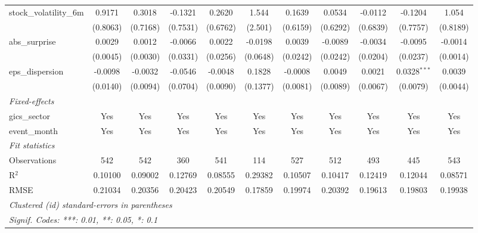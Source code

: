 \begin{tabular}{lcccccccccc}
   stock\_volatility\_6m   & 0.9171   & 0.3018   & -0.1321       & 0.2620       & 1.544    & 0.1639        & 0.0534        & -0.0112       & -0.1204        & 1.054\\   
                           & (0.8063) & (0.7168) & (0.7531)      & (0.6762)     & (2.501)  & (0.6159)      & (0.6292)      & (0.6839)      & (0.7757)       & (0.8189)\\   
   abs\_surprise           & 0.0029   & 0.0012   & -0.0066       & 0.0022       & -0.0198  & 0.0039        & -0.0089       & -0.0034       & -0.0095        & -0.0014\\   
                           & (0.0045) & (0.0030) & (0.0331)      & (0.0256)     & (0.0648) & (0.0242)      & (0.0242)      & (0.0204)      & (0.0237)       & (0.0014)\\   
   eps\_dispersion         & -0.0098  & -0.0032  & -0.0546       & -0.0048      & 0.1828   & -0.0008       & 0.0049        & 0.0021        & 0.0328$^{***}$ & 0.0039\\   
                           & (0.0140) & (0.0094) & (0.0704)      & (0.0090)     & (0.1377) & (0.0081)      & (0.0089)      & (0.0067)      & (0.0079)       & (0.0044)\\   
   \midrule
   \emph{Fixed-effects}\\
   gics\_sector            & Yes      & Yes      & Yes           & Yes          & Yes      & Yes           & Yes           & Yes           & Yes            & Yes\\  
   event\_month            & Yes      & Yes      & Yes           & Yes          & Yes      & Yes           & Yes           & Yes           & Yes            & Yes\\  
   \midrule
   \emph{Fit statistics}\\
   Observations            & 542      & 542      & 360           & 541          & 114      & 527           & 512           & 493           & 445            & 543\\  
   R$^2$                   & 0.10100  & 0.09002  & 0.12769       & 0.08555      & 0.29382  & 0.10507       & 0.10417       & 0.12419       & 0.12044        & 0.08571\\  
   RMSE                    & 0.21034  & 0.20356  & 0.20423       & 0.20549      & 0.17859  & 0.19974       & 0.20392       & 0.19613       & 0.19803        & 0.19938\\  
   \midrule \midrule
   \multicolumn{11}{l}{\emph{Clustered (id) standard-errors in parentheses}}\\
   \multicolumn{11}{l}{\emph{Signif. Codes: ***: 0.01, **: 0.05, *: 0.1}}\\
\end{tabular}
\par\endgroup
